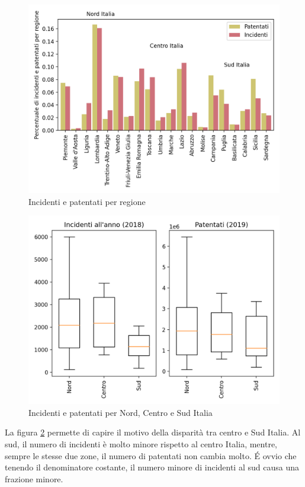 \documentclass[a4paper,12pt]{report}
\begin{document}
\begin{figure}
    \includegraphics[width=\linewidth]{../src/incidenti/incidenti_aci/mappe_regioni/incidenti_patenti_bar.png}
    \caption{Incidenti e patentati per regione}
    \label{fig:incidenti-patentati-bar}
\end{figure}

\begin{figure}
    \includegraphics[width=\linewidth]{../src/incidenti/incidenti_aci/mappe_regioni/incidenti_patenti_box.png}
    \caption{Incidenti e patentati per Nord, Centro e Sud Italia}
    \label{fig:incidenti-patentati-box}
\end{figure}

La figura \ref{fig:incidenti-patentati-box} permette di capire il motivo della disparità 
tra centro e Sud Italia.
Al sud, il numero di incidenti è molto minore rispetto al centro Italia, mentre, 
sempre le stesse due zone, il numero di patentati non cambia molto. 
\'E ovvio che tenendo il denominatore costante, il numero minore di incidenti al 
sud causa una frazione minore.
\end{document}
